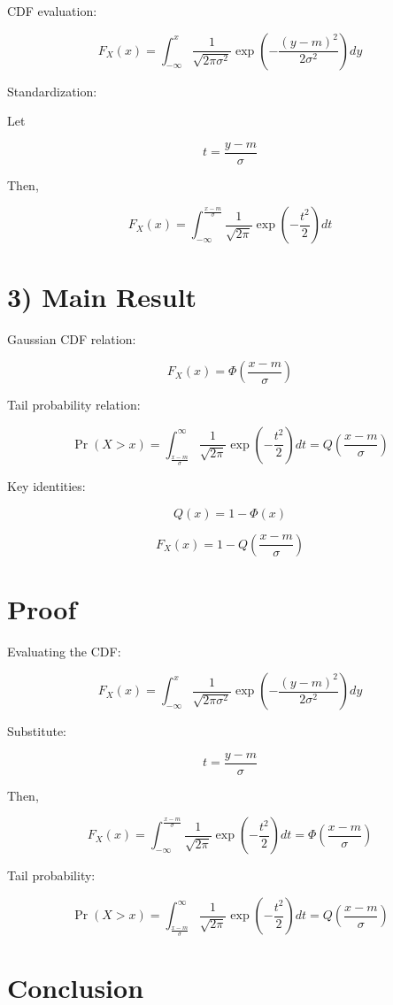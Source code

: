 \documentclass[12pt]{article}
\begin{document}
CDF evaluation:

\[
F_X(x)
=
\int_{-\infty}^{x}
\frac{1}{\sqrt{2\pi\sigma^2}}
\exp
\left(
-
\frac{(y-m)^2}{2\sigma^2}
\right)
dy
\]

Standardization:

Let

\[
t =
\frac{y-m}{\sigma}
\]

Then,

\[
F_X(x)
=
\int_{-\infty}^{\frac{x-m}{\sigma}}
\frac{1}{\sqrt{2\pi}}
\exp
\left(
-
\frac{t^2}{2}
\right)
dt
\]

\section*{3) Main Result}

Gaussian CDF relation:

\[
F_X(x)
=
\Phi
\left(
\frac{x-m}{\sigma}
\right)
\]

Tail probability relation:

\[
\Pr(X > x)
=
\int_{\frac{x-m}{\sigma}}^{\infty}
\frac{1}{\sqrt{2\pi}}
\exp
\left(
-
\frac{t^2}{2}
\right)
dt
=
Q
\left(
\frac{x-m}{\sigma}
\right)
\]

Key identities:

\[
Q(x)
=
1 - \Phi(x)
\]

\[
F_X(x)
=
1 -
Q
\left(
\frac{x-m}{\sigma}
\right)
\]

\section*{Proof}

Evaluating the CDF:

\[
F_X(x)
=
\int_{-\infty}^{x}
\frac{1}{\sqrt{2\pi\sigma^2}}
\exp
\left(
-
\frac{(y-m)^2}{2\sigma^2}
\right)
dy
\]

Substitute:

\[
t =
\frac{y-m}{\sigma}
\]

Then,

\[
F_X(x)
=
\int_{-\infty}^{\frac{x-m}{\sigma}}
\frac{1}{\sqrt{2\pi}}
\exp
\left(
-
\frac{t^2}{2}
\right)
dt
=
\Phi
\left(
\frac{x-m}{\sigma}
\right)
\]

Tail probability:

\[
\Pr(X > x)
=
\int_{\frac{x-m}{\sigma}}^{\infty}
\frac{1}{\sqrt{2\pi}}
\exp
\left(
-
\frac{t^2}{2}
\right)
dt
=
Q
\left(
\frac{x-m}{\sigma}
\right)
\]

\section*{Conclusion}
\end{document}
